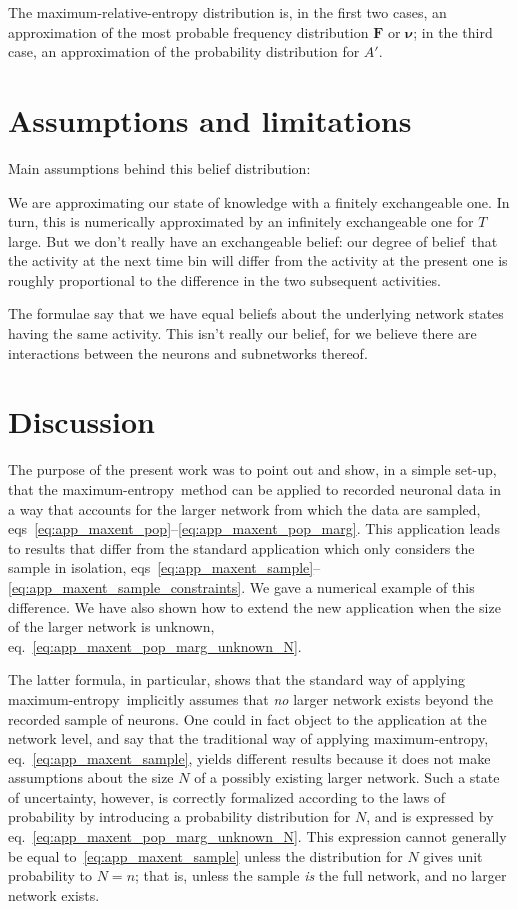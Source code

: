 \documentclass[\ifafour a4paper,12pt,\else a5paper,10pt,\fi%
onecolumn,oneside,article,%
british%
]{memoir}
\theoremstyle{remark}
\theoremstyle{innote}
\renewcommand*{\|}[1][]{\nonscript\,#1\vert\nonscript\;\mathopen{}}
\newcommand*{\eqn}{eq.}%
\newcommand*{\eqns}{eqs}%
\newcommand*{\dob}{degree of belief}
\newcommand*{\yAv}{A}
\newcommand*{\yNv}{N}
\newcommand*{\yFF}{F}
\newcommand*{\yF}{\bm{\yFF}}
\newcommand*{\yA}{\yAv}%
\newcommand*{\ynuu}{\nu}
\newcommand*{\ynu}{\bm{\ynuu}}
\newcommand*{\me}{maximum-entropy}
\begin{document}
\bigskip

The maximum-relative-entropy distribution is, in the first two cases, an
approximation of the most probable frequency distribution $\yF$ or $\ynu$;
in the third case, an approximation of the probability distribution for
$\yA'$.

\section{Assumptions and limitations}
\label{sec:assumptions}

Main assumptions behind this belief distribution:

We are approximating our state of knowledge with a finitely exchangeable
one. In turn, this is numerically approximated by an infinitely
exchangeable one for $T$ large. But we don't really have an exchangeable
belief: our \dob\ that the activity at the next time bin will
differ from the activity at the present one is roughly proportional to the
difference in the two subsequent activities.

The formulae say that we have equal beliefs about the underlying network
states having the same activity. This isn't really our belief, for we
believe there are interactions between the neurons and subnetworks thereof.


\section{Discussion}
\label{sec:discussion}

The purpose of the present work was to point out and show, in a simple
set-up, that the \me\ method can be applied to recorded neuronal data in a
way that accounts for the larger network from which the data are
sampled, \eqns~\eqref{eq:app_maxent_pop}--\eqref{eq:app_maxent_pop_marg}.
This application leads to results that differ from the standard application
which only considers the sample in isolation,
\eqns~\eqref{eq:app_maxent_sample}--\eqref{eq:app_maxent_sample_constraints}.
We gave a numerical example of this difference. We have also shown how to
extend the new application when the size of the larger network is
unknown, \eqn~\eqref{eq:app_maxent_pop_marg_unknown_N}.

The latter formula, in particular, shows that the standard way of applying
\me\ 
implicitly assumes that \emph{no} larger network exists beyond the
recorded sample of neurons. One could in fact object to the application at
the network level, and say that the traditional way of applying \me,
\eqn~\eqref{eq:app_maxent_sample}, yields different results because it does
not make assumptions about the size $\yNv$ of a possibly existing larger
network. Such a state of uncertainty, however, is correctly formalized
according to the laws of probability by introducing a probability
distribution for $\yNv$, and is expressed by
\eqn~\eqref{eq:app_maxent_pop_marg_unknown_N}. This expression cannot
generally be equal to~\eqref{eq:app_maxent_sample} unless the distribution
for $\yNv$ gives unit probability to $\yNv=n$; that is, unless the sample
\emph{is} the full network, and no larger network exists.
\end{document}
